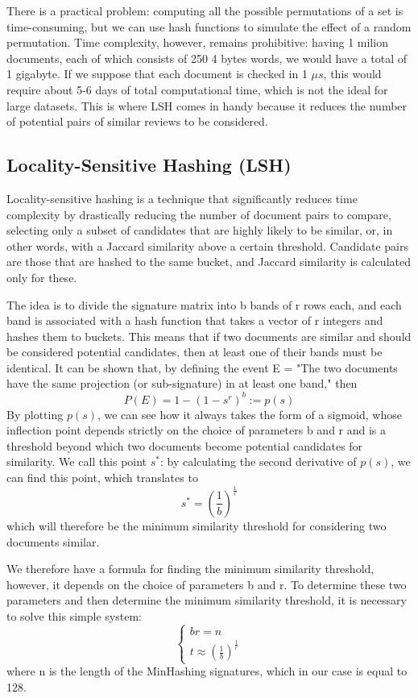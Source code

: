 \documentclass[12pt, a4paper[]{article}
\begin{document}
There is a practical problem: computing all the possible permutations of a set is time-consuming, but we can use hash functions to simulate the effect of a random permutation. Time complexity, however, remains prohibitive: having 1 milion documents, each of which consists of 250 4 bytes words, we would have a total of 1 gigabyte. If we suppose that each document is checked in 1 $\mu s
$, this would require about 5-6 days of total computational time, which is not the ideal for large datasets. This is where LSH comes in handy because it reduces the number of potential pairs of similar reviews to be considered. 
\subsection{Locality-Sensitive Hashing (LSH)}
Locality-sensitive hashing is a technique that significantly reduces time complexity by drastically reducing the number of document pairs to compare, selecting only a subset of candidates that are highly likely to be similar, or, in other words, with a Jaccard similarity above a certain threshold. Candidate pairs are those that are hashed to the same bucket, and Jaccard similarity is calculated only for these.

The idea is to divide the signature matrix into b bands of r rows each, and each band is associated with a hash function that takes a vector of r integers and hashes them to buckets. This means that if two documents are similar and should be considered potential candidates, then at least one of their bands must be identical. It can be shown that, by defining the event E = "The two documents have the same projection (or sub-signature) in at least one band," then
\begin{equation}
    P(E) = 1-(1-s^r)^b := p(s)
\end{equation}
By plotting $p(s)$, we can see how it always takes the form of a sigmoid, whose inflection point depends strictly on the choice of parameters b and r and is a threshold beyond which two documents become potential candidates for similarity. We call this point $s^*$: by calculating the second derivative of $p(s)$, we can find this point, which translates to
\begin{equation}
    s^* = (\frac{1}{b})^\frac{1}{r}
\end{equation}
which will therefore be the minimum similarity threshold for considering two documents similar.

We therefore have a formula for finding the minimum similarity threshold, however, it depends on the choice of parameters b and r. To determine these two parameters and then determine the minimum similarity threshold, it is necessary to solve this simple system: 
\begin{equation}
    \begin{cases}
        br = n \\ t \approx (\frac{1}{b})^\frac{1}{r}
    \end{cases}
\end{equation}
where n is the length of the MinHashing signatures, which in our case is equal to 128. 
\end{document}
